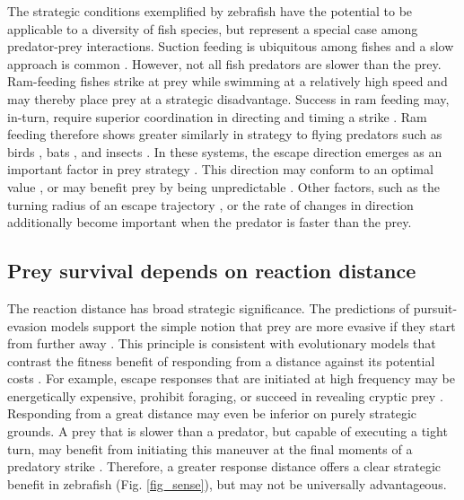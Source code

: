 \documentclass[]{rsos}%
\begin{document}
The strategic conditions exemplified by zebrafish have the potential to be applicable to a diversity of fish species, but represent a special case among predator-prey interactions.
Suction feeding is ubiquitous among fishes and a slow approach is common \cite{Webb:1984jz,Higham:2007go}.
However, not all fish predators are slower than the prey.
Ram-feeding fishes strike at prey while swimming at a relatively high speed and may thereby place prey at a strategic disadvantage.
Success in ram feeding may, in-turn, require superior coordination in directing and timing a strike \cite{Wainwright:2001ufa}.
Ram feeding therefore shows greater similarly in strategy to flying predators such as birds \cite{Shifferman:2004fs}, bats \cite{Ghose:2006dk}, and insects \cite{Combes:2012et}.
In these systems, the escape direction emerges as an important factor in prey strategy \cite{Domenici:2011tv,Domenici:2011vl}.
This direction may conform to an optimal value \cite{Weihs:1984tb}, or may benefit prey by being unpredictable \cite{Humphries:1970hy}.
Other factors, such as the turning radius of an escape trajectory \cite{Howland:1974ud}, or the rate of changes in direction \cite{Humphries:1970hy} additionally become important when the predator is faster than the prey. 


\subsection{Prey survival depends on reaction distance} 

The reaction distance has broad strategic significance.
The predictions of pursuit-evasion models support the simple notion that prey are more evasive if they start from further away \cite{Soto:2015cj,Isaacs:1965uz,Weihs:1984tb}.
This principle is consistent with evolutionary models that contrast the fitness benefit of responding from a distance against its potential costs \cite{Cooper:2015vf,Ydenberg:1986tm}.
For example, escape responses that are initiated at high frequency may be energetically expensive, prohibit foraging, or succeed in revealing cryptic prey \cite{Broom:2005gq}.
Responding from a great distance may even be inferior on purely strategic grounds.
A prey that is slower than a predator, but capable of executing a tight turn, may benefit from initiating this maneuver at the final moments of a predatory strike \cite{Howland:1974ud}.
Therefore, a greater response distance offers a clear strategic benefit in zebrafish (Fig. \ref{fig_sense}), but may not be universally advantageous.
\end{document}
